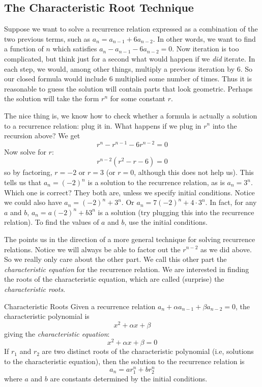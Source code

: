 \documentclass[12pt]{article}
\begin{document}
\subsection{The Characteristic Root Technique}

Suppose we want to solve a recurrence relation expressed as a combination of the two previous terms, such as $a_n = a_{n-1} + 6a_{n-2}$. In other words, we want to find a function of $n$ which satisfies $a_n - a_{n-1} - 6a_{n-2} = 0$.  Now iteration is too complicated, but think just for a second what would happen if we {\em did} iterate.  In each step, we would, among other things, multiply a previous iteration by 6.   So our closed formula would include $6$ multiplied some number of times.  Thus it is reasonable to guess the solution will contain parts that look geometric.  Perhaps the solution will take the form $r^n$ for some constant $r$.
 
The nice thing is, we know how to check whether a formula is actually a solution to a recurrence relation: plug it in.  What happens if we plug in $r^n$ into the recursion above? We get  \[r^n - r^{n-1} - 6r^{n-2} = 0\]  Now solve for $r$: \[r^{n-2}(r^2 - r - 6) = 0\]
so by factoring, $r = -2$ or $r = 3$ (or $r = 0$, although this does not help us).  This tells us that $a_n = (-2)^n$ is a solution to the recurrence relation, as is $a_n = 3^n$.  Which one is correct?  They both are, unless we specify initial conditions.  Notice we could also have $a_n = (-2)^n + 3^n$.  Or $a_n = 7(-2)^n + 4\cdot 3^n$.  In fact, for any $a$ and $b$, $a_n = a(-2)^n + b 3^n$ is a solution (try plugging this into the recurrence relation).  To find the values of $a$ and $b$, use the initial conditions.
 
The points us in the direction of a more general technique for solving recurrence relations.  Notice we will always be able to factor out the $r^{n-2}$ as we did above.  So we really only care about the other part.  We call this other part the \emph{characteristic equation} for the recurrence relation.  We are interested in finding the roots of the characteristic equation, which are called (surprise) the \emph{characteristic roots}.  

\begin{defbox}{Characteristic Roots}
 Given a recurrence relation $a_n + \alpha a_{n-1} + \beta a_{n-2} = 0$, the characteristic polynomial is
 \[x^2 + \alpha x + \beta\]
 giving the {\em characteristic equation}:
 \[x^2 + \alpha x + \beta = 0\]
 If $r_1$ and $r_2$ are two distinct roots of the characteristic polynomial (i.e, solutions to the characteristic equation), then the solution to the recurrence relation is
 \[a_n = ar_1^n + br_2^n\]
 where $a$ and $b$ are constants determined by the initial conditions.
\end{defbox}
\end{document}

